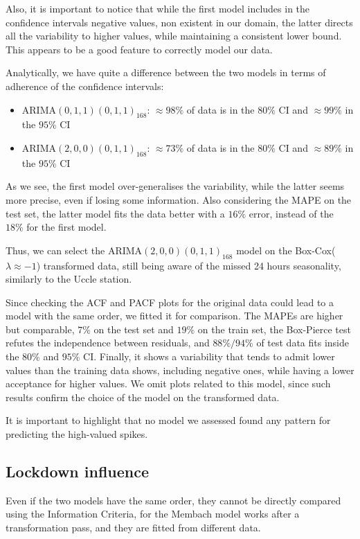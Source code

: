 \documentclass[12pt]{article}
\begin{document}
Also, it is important to notice that while the first model includes in the confidence intervals negative values, non existent in our domain, the latter directs all the variability to higher values, while maintaining a consistent lower bound. This appears to be a good feature to correctly model our data.

Analytically, we have quite a difference between the two models in terms of adherence of the confidence intervals:
\begin{itemize}[topsep=0.5em,itemsep=0em,partopsep=0.5em]
	\item $\mathrm{ARIMA}(0,1,1)(0,1,1)_{168}$: $\approx98\%$ of data is in the $80\%$ CI and $\approx99\%$ in the $95\%$ CI
	\item $\mathrm{ARIMA}(2,0,0)(0,1,1)_{168}$: $\approx73\%$ of data is in the $80\%$ CI and $\approx89\%$ in the $95\%$ CI
\end{itemize}
As we see, the first model over-generalises the variability, while the latter seems more precise, even if losing some information. Also considering the MAPE on the test set, the latter model fits the data better with a $16\%$ error, instead of the $18\%$ for the first model.
%

Thus, we can select the $\mathrm{ARIMA}(2,0,0)(0,1,1)_{168}$ model on the Box-Cox($\lambda\approx-1$) transformed data, still being aware of the missed 24 hours seasonality, similarly to the Uccle station.

Since checking the ACF and PACF plots for the original data could lead to a model with the same order, we fitted it for comparison. The MAPEs are higher but comparable, $7\%$ on the test set and $19\%$ on the train set, the Box-Pierce test refutes the independence between residuals, and $88\%/94\%$ of test data fits inside the $80\%$ and $95\%$ CI. Finally, it shows a variability that tends to admit lower values than the training data shows, including negative ones, while having a lower acceptance for higher values. We omit plots related to this model, since such results confirm the choice of the model on the transformed data.

It is important to highlight that no model we assessed found any pattern for predicting the high-valued spikes.

\subsection{Lockdown influence}
Even if the two models have the same order, they cannot be directly compared using the Information Criteria, for the Membach model works after a transformation pass, and they are fitted from different data.
\end{document}
